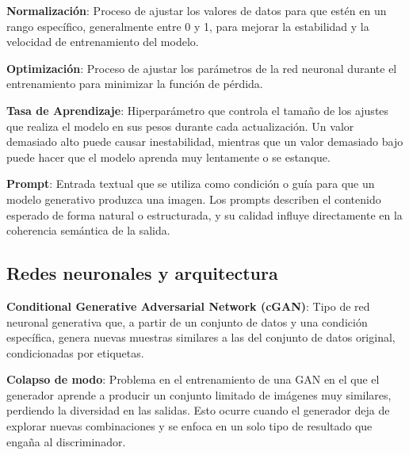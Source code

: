 \vspace{5mm}

\textbf{Normalización}: Proceso de ajustar los valores de datos para que estén en un rango específico, generalmente entre 0 y 1, para mejorar la estabilidad y la velocidad de entrenamiento del modelo.

\vspace{5mm}

\textbf{Optimización}: Proceso de ajustar los parámetros de la red neuronal durante el entrenamiento para minimizar la función de pérdida.

\vspace{5mm}

\textbf{Tasa de Aprendizaje}: Hiperparámetro que controla el tamaño de los ajustes que realiza el modelo en sus pesos durante cada actualización. Un valor demasiado alto puede causar inestabilidad, mientras que un valor demasiado bajo puede hacer que el modelo aprenda muy lentamente o se estanque.

\vspace{5mm}

\textbf{Prompt}: Entrada textual que se utiliza como condición o guía para que un modelo generativo produzca una imagen. Los prompts describen el contenido esperado de forma natural o estructurada, y su calidad influye directamente en la coherencia semántica de la salida.

\vspace{5mm}

\subsection{Redes neuronales y arquitectura}

\textbf{Conditional Generative Adversarial Network (cGAN)}: Tipo de red neuronal generativa que, a partir de un conjunto de datos y una condición específica, genera nuevas muestras similares a las del conjunto de datos original, condicionadas por etiquetas.

\vspace{5mm}

\textbf{Colapso de modo}: Problema en el entrenamiento de una GAN en el que el generador aprende a producir un conjunto limitado de imágenes muy similares, perdiendo la diversidad en las salidas. Esto ocurre cuando el generador deja de explorar nuevas combinaciones y se enfoca en un solo tipo de resultado que engaña al discriminador.

\vspace{5mm}

